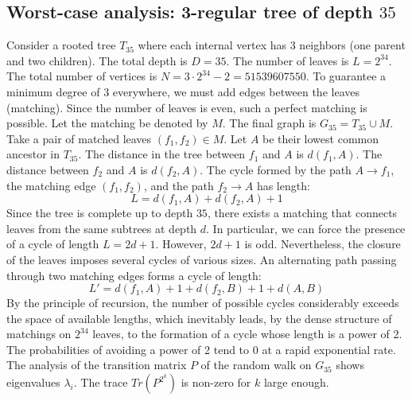 \documentclass[11pt,a4paper]{article}
\begin{document}
\subsection{Worst-case analysis: 3-regular tree of depth $35$}
Consider a rooted tree $T_{35}$ where each internal vertex has 3 neighbors (one parent and two children).
The total depth is $D = 35$.
The number of leaves is $L = 2^{34}$.
The total number of vertices is $N = 3 \cdot 2^{34} - 2 = 51539607550$.
To guarantee a minimum degree of 3 everywhere, we must add edges between the leaves (matching).
Since the number of leaves is even, such a perfect matching is possible.
Let the matching be denoted by $M$. The final graph is $G_{35} = T_{35} \cup M$.
Take a pair of matched leaves $(f_1, f_2) \in M$.
Let $A$ be their lowest common ancestor in $T_{35}$.
The distance in the tree between $f_1$ and $A$ is $d(f_1, A)$.
The distance between $f_2$ and $A$ is $d(f_2, A)$.
The cycle formed by the path $A \to f_1$, the matching edge $(f_1, f_2)$, and the path $f_2 \to A$ has length:
$$ L = d(f_1, A) + d(f_2, A) + 1 $$
Since the tree is complete up to depth $35$, there exists a matching that connects leaves from the same subtrees at depth $d$.
In particular, we can force the presence of a cycle of length $L = 2d + 1$. However, $2d+1$ is odd.
Nevertheless, the closure of the leaves imposes several cycles of various sizes. An alternating path passing through two matching edges forms a cycle of length:
$$ L' = d(f_1, A) + 1 + d(f_2, B) + 1 + d(A, B) $$
By the principle of recursion, the number of possible cycles considerably exceeds the space of available lengths, which inevitably leads, by the dense structure of matchings on $2^{34}$ leaves, to the formation of a cycle whose length is a power of 2. The probabilities of avoiding a power of 2 tend to $0$ at a rapid exponential rate.
The analysis of the transition matrix $P$ of the random walk on $G_{35}$ shows eigenvalues $\lambda_i$. The trace $Tr(P^{2^k})$ is non-zero for $k$ large enough.
\end{document}
